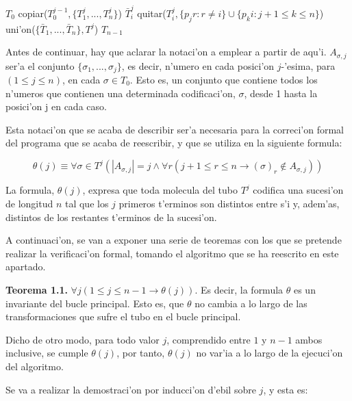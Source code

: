 \documentclass[12pt]{article}
\begin{document}
\begin{algorithmic}
    \Require $T_{0}$
        \State copiar($T^{j-1}_{0}, \{T^{j}_{1},...,T^{j}_{n}\}$)
            \State $\bar{T}^{j}_{i}$ \leftarrow quitar($T^{j}_{i}, \{p_{j}r : r \neq i\} \cup \{p_{k}i : j + 1 \leq k \leq n\} $)
        \EndFor
        \State uni'on($\{\bar{T}_{1},...,\bar{T}_{n}\},T^{j}$)
    \EndFor
    \Return $T_{n - 1}$
\end{algorithmic}

Antes de continuar, hay que aclarar la notaci'on a emplear a partir de aqu'i. $A_{\sigma,j}$ ser'a el conjunto
$\{\sigma_{1},...,\sigma_{j}\}$, es decir, n'umero en cada posici'on $j$-'esima, para $(1 \leq j \leq n)$, en cada
$\sigma \in T_{0}$. Esto es, un conjunto que contiene todos los n'umeros que contienen una determinada codificaci'on, $\sigma$,
desde 1 hasta la posici'on j en cada caso.

Esta notaci'on que se acaba de describir ser'a necesaria para la correci'on formal del programa que se
acaba de reescribir, y que se utiliza en la siguiente formula:

\begin{equation*}
  \theta(j) \equiv \forall \sigma \in T^{j} (|A_{\sigma,j}| = j \land \forall r ( j + 1 \leq r \leq n \longrightarrow
  (\sigma)_{r} \notin A_{\sigma,j} ))
\end{equation*}

La formula, $\theta(j)$, expresa que toda molecula del tubo $T^{j}$ codifica una sucesi'on de longitud $n$ tal que
los $j$ primeros t'erminos son distintos entre s'i y, adem'as, distintos de los restantes t'erminos de la sucesi'on.

A continuaci'on, se van a exponer una serie de teoremas con los que se pretende realizar la verificaci'on formal,
tomando el algoritmo que se ha reescrito en este apartado.

\textbf{Teorema 1.1.} $\forall j (1 \leq j \leq n-1 \longrightarrow \theta(j))$. Es decir, la formula $\theta$ es un invariante del
bucle principal. Esto es, que $\theta$ no cambia a lo largo de las transformaciones que sufre el tubo en el bucle principal.

Dicho de otro modo, para todo valor $j$, comprendido entre $1$ y $n-1$ ambos inclusive, se cumple $\theta(j)$, por tanto, $\theta(j)$
no var'ia a lo largo de la ejecuci'on del algoritmo.

Se va a realizar la demostraci'on por inducci'on d'ebil sobre $j$, y esta es:
\end{document}
